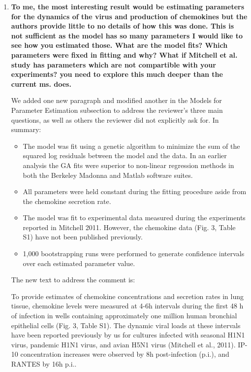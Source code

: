 \documentclass[10pt]{article}
\newcommand{\new}[1]{{\color{dkgreen}#1}}
\newenvironment{response}{\fontfamily{cms}\selectfont\small}{\par}
\begin{document}
\begin{enumerate}

\item \textbf{To me, the most interesting result would be estimating parameters for the dynamics of the virus and production of chemokines but the authors provide little to no details of how this was done. This is not sufficient as the model has so many parameters I would like to see how you estimated those. What are the model fits? Which parameters were fixed in fitting and why? What if Mitchell et al. study has parameters which are not compartible with your experiments? you need to explore this much deeper than the current ms. does.}

\begin{response}
We added one new paragraph and modified another in the Models for Parameter Estimation subsection to address the reviewer's three main questions, as well as others the reviewer did not explicitly ask for.  In summary:
\begin{itemize}
\item The model was fit using a genetic algorithm to minimize the sum of the squared log residuals between the model and the data.  In an earlier analysis the GA fits were superior to non-linear regression methods in both the Berkeley Madonna and Matlab software suites.
\item All parameters were held constant during the fitting procedure aside from the chemokine secretion rate.  
\item The model was fit to experimental data measured during the experiments reported in Mitchell 2011.  However, the chemokine data (Fig. 3, Table S1) have not been published previously.
\item 1,000 bootstrapping runs were performed to generate confidence intervals over each estimated parameter value.
\end{itemize}

The new text to address the comment is:

\begin{displayquote}
\new{To provide estimates of chemokine concentrations and secretion rates in lung tissue, chemokine levels were measured at 4-6h intervals during the first 48 h of infection in wells containing approximately one million human bronchial epithelial cells (Fig. 3, Table S1).  The dynamic viral loads at these intervals have been reported previously by us for cultures infected with seasonal H1N1 virus, pandemic H1N1 virus, and avian H5N1 virus (Mitchell et al., 2011).  IP-10 concentration increases were observed by 8h post-infection (p.i.), and RANTES by 16h p.i..}


\end{displayquote}
\end{response}
\end{enumerate}
\end{document}
